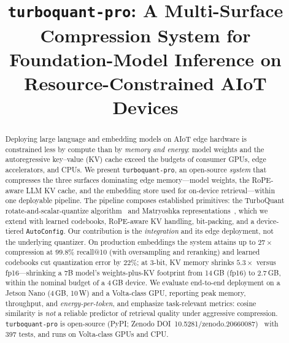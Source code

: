 \documentclass[10pt,conference,compsoc]{IEEEtran}
\begin{document}
\title{\texttt{turboquant-pro}: A Multi-Surface Compression System for\\
Foundation-Model Inference on Resource-Constrained AIoT Devices}

\author{
}

\maketitle

\begin{abstract}
Deploying large language and embedding models on AIoT edge hardware is
constrained less by compute than by \emph{memory and energy}: model weights and
the autoregressive key--value (KV) cache exceed the budgets of consumer GPUs,
edge accelerators, and CPUs. We present \texttt{turboquant-pro}, an open-source
\emph{system} that compresses the three surfaces dominating edge memory---model
weights, the RoPE-aware LLM KV cache, and the embedding store used for on-device
retrieval---within one deployable pipeline. The pipeline composes established
primitives: the TurboQuant rotate-and-scalar-quantize algorithm~\cite{turboquant}
and Matryoshka representations~\cite{mrl}, which we extend with learned codebooks,
RoPE-aware KV handling, bit-packing, and a device-tiered \texttt{AutoConfig}. Our
contribution is the \emph{integration} and its edge deployment, not the underlying
quantizer. On production embeddings the system attains up to $27\times$
compression at $99.8\%$ recall@10 (with oversampling and reranking) and learned
codebooks cut quantization error by $22\%$; at 3-bit, KV memory shrinks
$5.3\times$ versus fp16---shrinking a 7B model's weights-plus-KV footprint from
14\,GB (fp16) to 2.7\,GB, within the nominal budget of a 4\,GB device. We evaluate
end-to-end deployment on a Jetson Nano (4\,GB, 10\,W) and a Volta-class GPU,
reporting peak memory, throughput, and \emph{energy-per-token}, and emphasize
task-relevant metrics: cosine similarity is \emph{not} a reliable predictor of
retrieval quality under aggressive compression. \texttt{turboquant-pro} is
open-source (PyPI; Zenodo DOI~10.5281/zenodo.20660087)~\cite{turboquantpro} with
397 tests, and runs on Volta-class GPUs and CPU.
\end{abstract}
\end{document}
